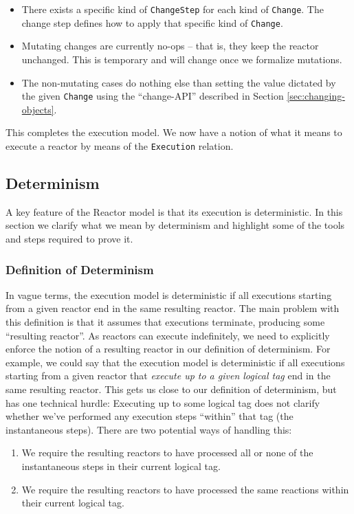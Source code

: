 \begin{itemize}
  \item There exists a specific kind of \lstinline{ChangeStep} for each kind of \lstinline{Change}.
        The change step defines how to apply that specific kind of \lstinline{Change}.
  \item Mutating changes are currently no-ops -- that is, they keep the reactor unchanged.
        This is temporary and will change once we formalize mutations.
  \item The non-mutating cases do nothing else than setting the value dictated by the given \lstinline{Change} using the ``change-API'' described in Section \ref{sec:changing-objects}.
\end{itemize}

This completes the execution model.
We now have a notion of what it means to execute a reactor by means of the \lstinline{Execution} relation.

\subsection{Determinism}

A key feature of the Reactor model is that its execution is deterministic.
In this section we clarify what we mean by determinism and highlight some of the tools and steps required to prove it.

\subsubsection{Definition of Determinism}

In vague terms, the execution model is deterministic if all executions starting from a given reactor end in the same resulting reactor.
The main problem with this definition is that it assumes that executions terminate, producing some ``resulting reactor''.
As reactors can execute indefinitely, we need to explicitly enforce the notion of a resulting reactor in our definition of determinism.
For example, we could say that the execution model is deterministic if all executions starting from a given reactor that \emph{execute up to a given logical tag} end in the same resulting reactor.
This gets us close to our definition of determinism, but has one technical hurdle: 
Executing up to some logical tag does not clarify whether we've performed any execution steps ``within'' that tag (the instantaneous steps).
There are two potential ways of handling this:

\begin{enumerate}
  \item We require the resulting reactors to have processed all or none of the instantaneous steps in their current logical tag.
  \item We require the resulting reactors to have processed the same reactions within their current logical tag.
\end{enumerate}

